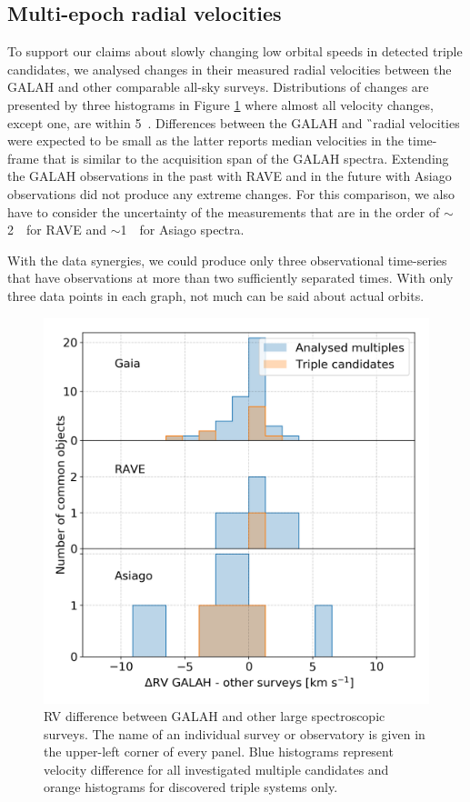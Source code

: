 \subsection{Multi-epoch radial velocities}
\label{sec:orbits_rv}
To support our claims about slowly changing low orbital speeds in detected triple candidates, we analysed changes in their measured radial velocities between the GALAH and other comparable all-sky surveys. Distributions of changes are presented by three histograms in Figure \ref{fig:rv_survey} where almost all velocity changes, except one, are within 5~\kms. Differences between the GALAH and \G\ radial velocities were expected to be small as the latter reports median velocities in the time-frame that is similar to the acquisition span of the GALAH spectra. Extending the GALAH observations in the past with RAVE and in the future with Asiago observations did not produce any extreme changes. For this comparison, we also have to consider the uncertainty of the measurements that are in the order of $\sim$2~\kms\ for RAVE and $\sim$1~\kms\ for Asiago spectra.

With the data synergies, we could produce only three observational time-series that have observations at more than two sufficiently separated times. With only three data points in each graph, not much can be said about actual orbits.

\begin{figure}
	\centering
	\includegraphics[width=\columnwidth]{guess_all_rv_diff.png}
	\caption{RV difference between GALAH and other large spectroscopic surveys. The name of an individual survey or observatory is given in the upper-left corner of every panel. Blue histograms represent velocity difference for all investigated multiple candidates and orange histograms for discovered triple systems only.}
	\label{fig:rv_survey}
\end{figure}

